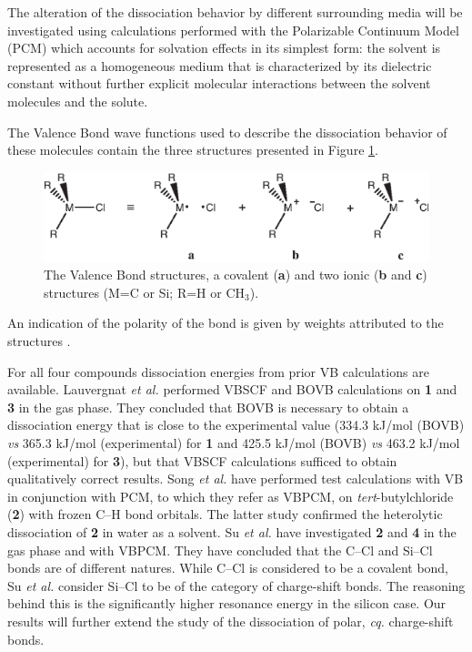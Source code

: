 The alteration of the dissociation behavior by different surrounding media will be investigated using calculations performed with the Polarizable Continuum Model (PCM) \cite{pcm1,pcm2} which accounts for solvation effects in its simplest form: the solvent is represented as a homogeneous medium that is characterized by its dielectric constant without further explicit molecular interactions between the solvent molecules and the solute. 

The Valence Bond wave functions used to describe the dissociation behavior of these molecules contain the three structures presented in Figure \ref{ch3.fig.structures}.
\begin{figure}[htbp]
\begin{center}
\includegraphics{dissociation/figures/structures.eps}
\end{center}
\caption{The Valence Bond structures, a covalent (\textbf{a}) and two ionic (\textbf{b} and \textbf{c}) structures (M=C or Si; R=H or CH$_3$).}
\label{ch3.fig.structures}
\end{figure}
An indication of the polarity of the bond is given by weights attributed to the structures \cite{coulson}. 

For all four compounds dissociation energies from prior VB calculations are available. Lauvergnat \textit{et al.} \cite{lauvergnat} performed VBSCF \cite{vbscf1,vbscf2} and BOVB \cite{bovb1,bovb2,bovb3} calculations on \textbf{1} and \textbf{3} in the gas phase. They concluded that BOVB is necessary to obtain a dissociation energy that is close to the experimental value (334.3 kJ/mol (BOVB) \textit{vs} 365.3 kJ/mol (experimental) for \textbf{1} and 425.5 kJ/mol (BOVB) \textit{vs} 463.2 kJ/mol (experimental) for \textbf{3}), but that VBSCF calculations sufficed to obtain qualitatively correct results.  Song \textit{et al.} \cite{song} have performed test calculations with VB in conjunction with PCM, to which they refer as VBPCM, on \textit{tert}-butylchloride (\textbf{2}) with frozen C--H bond orbitals. The latter study confirmed the heterolytic dissociation of \textbf{2} in water as a solvent. Su \textit{et al.} \cite{psu} have investigated \textbf{2} and \textbf{4} in the gas phase and with VBPCM. They have concluded that the C--Cl and Si--Cl bonds are of different natures. While C--Cl is considered to be a covalent bond, Su \textit{et al.} consider Si--Cl to be of the category of charge-shift bonds. The reasoning behind this is the significantly higher resonance energy in the silicon case. Our results will further extend the study of the dissociation of polar, \textit{cq.} charge-shift bonds.

